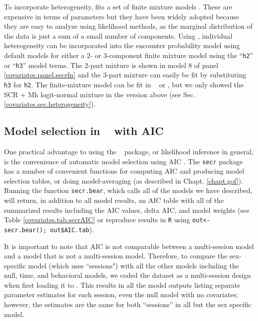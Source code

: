 To incorporate heterogeneity, \secr fits a set of 
finite mixture models \citep{norris_pollock:1996,
  pledger:2000}. These are expensive in terms of parameters but 
they have been widely adopted because they are easy to analyze using
likelihood methods, as the marginal distribution of the data is just a
sum of a small number of components.
Using \secr,  individual heterogeneity can be incorporated
into the encounter probability model using default models for 
 either a 2- or 3-component finite
mixture model 
using the  ``\mbox{\tt h2}'' or
``\mbox{\tt h3}'' model terms.
 The 2-part mixture is shown in model 8 of panel
\ref{covariates.panel.secrfn} and the 3-part mixture can easily be fit by
substituting \mbox{\tt h3} for \mbox{\tt h2}.  
The finite-mixture model 
can be fit in \jags~ or \bugs, but we only showed
the SCR + Mh logit-normal mixture in the version above (see
Sec. \ref{covariates.sec.heterogeneity}).



\subsection{Model selection in \secr~ with AIC}

One practical advantage to using the \secr~ package, or likelihood
inference in general, is the convenience of automatic model selection
using AIC \citep{burnham_anderson:2002}. The \mbox{\tt secr} package
has a number of convenient functions for computing AIC and producing
model selection tables, or doing model-averaging (as described in
 Chapt. \ref{chapt.gof}).
Running the function {\tt secr.bear}, which calls all of the models we
have described, will return, in addition to all model results, 
an AIC table with all of the summarized results including the AIC values,
delta AIC, and model weights (see Table \ref{covariates.tab.secrAIC}
or reproduce results in {\tt R} using {\tt out<- secr.bear(); out\$AIC.tab}). 


It is important to note that AIC is not comparable 
between a multi-session model and a model that is not a multi-session model.
Therefore, to compare the sex-specific model (which uses ``sessions") with all the other models
including the null, time, and behavioral models, we coded the dataset as a 
multi-session design when first loading it to \secr.  This results in 
all the model outputs listing separate parameter estimates for each session, even the null model
with no covariates; however, the estimates are the same for both ``sessions''
in all but the sex specific model. 


